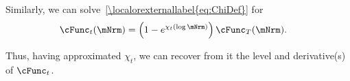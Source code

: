 \documentclass[\econtexRoot/BufferStockTheory]{subfiles}
\begin{document}
\begin{comment} %
\begin{equation}\begin{gathered}\begin{aligned}
 \lim_{\mu \downarrow -\infty} \chi^{\prime}(\mu)  & = \left(\frac{-\left(\frac{\cFunc^{\prime}_{t}\cFunc_{T}^{\prime}\mNrm-\cFunc_{t}^{\prime}\mNrm\cFunc_{T}^{\prime}}{(\cFunc_{T}^{\prime}\mNrm)^{2}}\mNrm\right)}{(\cFunc_{T}^{\prime}\mNrm-\cFunc_{t}^{\prime}\mNrm)/\cFunc_{T}^{\prime}\mNrm}\right)
\\  & = \left(\frac{-\left(\frac{\cFunc^{\prime}_{t}\cFunc_{T}^{\prime}-\cFunc_{t}^{\prime}\cFunc_{T}^{\prime}}{(\cFunc_{T}^{\prime})^{2}}\right)}{(\cFunc_{T}^{\prime}-\cFunc_{t}^{\prime})/\cFunc_{T}^{\prime}}\right)
\\  & = \left(\frac{-\left(\cFunc^{\prime}_{t}\cFunc_{T}^{\prime}-\cFunc_{t}^{\prime}\cFunc_{T}^{\prime}\right)}{(\cFunc_{T}^{\prime}-\cFunc_{t}^{\prime})\cFunc_{T}^{\prime}}\right)
\end{aligned}\end{gathered}\end{equation}
\end{comment}

Similarly, we can solve~\eqref{\localorexternallabel{eq:ChiDef}} for
\begin{equation}\begin{gathered}\begin{aligned}
    \cFunc_{t}(\mNrm)  & = \left(1-e^{\chi_{t}(\log \mNrm)}\right)\cFunc_{T}(\mNrm) \label{eq:cFuncFromChi}.
\end{aligned}\end{gathered}\end{equation}

Thus, having approximated $\chi_{t}$, we can recover from it the level and derivative(s) of $\cFunc_{t}$.%
\end{document}
